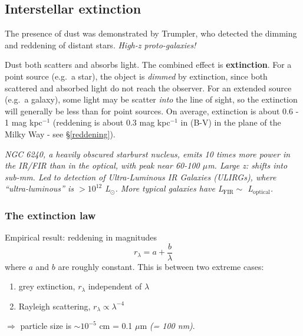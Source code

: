 \documentclass[11pt]{article}
\newcommand{\mar}[1]{\hspace{0pt}\marginpar{-\textcolor{black}{#1}-}}
\newcommand{\mynotes}[1]{{\fontfamily{cmss}\selectfont \textit{#1}}}
\begin{document}
\newpage
\subsection{Interstellar extinction}
\mar{116}The presence of dust was demonstrated by Trumpler, who detected the
dimming and reddening of distant stars. \mynotes{High-z proto-galaxies!}

Dust both scatters and absorbs light. The combined effect is
\textbf{extinction}. For a point source (e.g.\ a star), the object is
\emph{dimmed} by extinction, since both scattered and absorbed light do not
reach the observer. For an extended source (e.g.\ a galaxy), some light may be
scatter \emph{into} the line of sight, so the extinction will generally be less
than for point sources. On average, extinction is about 0.6 - 1 mag kpc$^{-1}$
(reddening is about 0.3 mag kpc$^{-1}$ in (B-V) in the plane of the Milky Way -
see \S{}\ref{reddening}).

\mynotes{NGC 6240, a heavily obscured starburst nucleus, emits 10 times more
power in the IR/FIR than in the optical, with peak near 60-100 $\mu$m.
Large z: shifts into sub-mm. Led to detection of Ultra-Luminous
IR Galaxies (ULIRGs), where ``ultra-luminous'' is $> 10^{12}$ L$_{\odot}$.
More typical galaxies have L$_{\mathrm{FIR}} \sim$ L$_{\mathrm{optical}}$.}

\newpage
\subsubsection{The extinction law}
\mar{117}Empirical result: reddening in magnitudes
\[
    r_{\lambda} = a + \frac{b}{\lambda}
    \]
where $a$ and $b$ are roughly constant. This is between two extreme cases:
\begin{enumerate}
    \item grey extinction, $r_{\lambda}$ independent of $\lambda$
    \item Rayleigh scattering, $r_{\lambda} \propto \lambda^{-4}$
\end{enumerate}
$\Rightarrow$ particle size is $\sim 10^{-5}$ cm = 0.1 $\mu$m
\mynotes{(= 100 nm)}.
\end{document}
